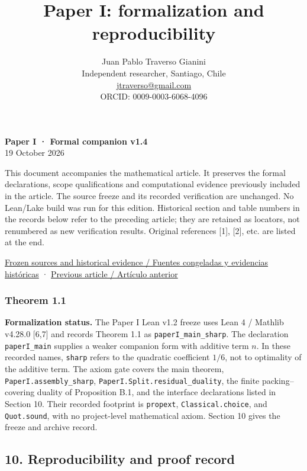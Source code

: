 \documentclass[english,11pt,a4paper]{article}
\title{Paper I: formalization and reproducibility}
\author{Juan Pablo Traverso Gianini\\\small Independent researcher, Santiago, Chile\\\small \href{mailto:jtraverso@gmail.com}{jtraverso@gmail.com}\\\small ORCID: 0009-0003-6068-4096}
\date{}
\begin{document}
\raggedbottom
\maketitle
\textbf{Paper I · Formal companion v1.4}\\
19 October 2026

This document accompanies the mathematical article. It preserves the
formal declarations, scope qualifications and computational evidence
previously included in the article. The source freeze and its recorded
verification are unchanged. No Lean/Lake build was run for this edition.
Historical section and table numbers in the records below refer to the
preceding article; they are retained as locators, not renumbered as new
verification results. Original references {[}1{]}, {[}2{]}, etc. are
listed at the end.

\href{https://github.com/jtraverso/erdos-81-chordal-clique-partitions/tree/eb335845bfa23375d5040ea31fc4f4b366346287/preprints/PAPER_I/05_formalization}{Frozen
sources and historical evidence / Fuentes congeladas y evidencias
históricas} ·
\href{https://github.com/jtraverso/erdos-81-chordal-clique-partitions/tree/eb335845bfa23375d5040ea31fc4f4b366346287/preprints/PAPER_I/01_manuscript}{Previous
article / Artículo anterior}

\subsubsection{Theorem 1.1}\label{theorem-1.1}

\textbf{Formalization status.} The Paper I Lean v1.2 freeze uses Lean 4
/ Mathlib v4.28.0 {[}6,7{]} and records Theorem 1.1 as
\nolinkurl{paperI_main_sharp}. The declaration \nolinkurl{paperI_main}
supplies a weaker companion form with additive term \(n\). In these
recorded names, \nolinkurl{sharp} refers to the quadratic coefficient
\(1/6\), not to optimality of the additive term. The axiom gate covers
the main theorem, \nolinkurl{PaperI.assembly_sharp},
\nolinkurl{PaperI.Split.residual_duality}, the finite packing--covering
duality of Proposition B.1, and the interface declarations listed in
Section 10. Their recorded footprint is \nolinkurl{propext},
\nolinkurl{Classical.choice}, and \nolinkurl{Quot.sound}, with no
project-level mathematical axiom. Section 10 gives the freeze and
archive record.

\subsection{10. Reproducibility and proof
record}\label{reproducibility-and-proof-record}
\end{document}
